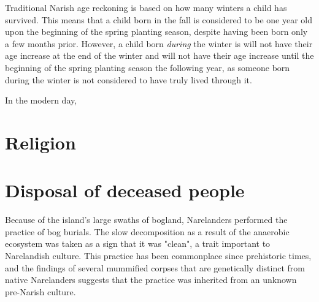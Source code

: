 \documentclass[a4paper,11pt,twoside,openright]{memoir}
\begin{document}
Traditional Narish age reckoning is based on how many winters a child has survived. This means that a child born in the fall is considered to be one year old upon the beginning of the spring planting season, despite having been born only a few months prior. However, a child born \emph{during} the winter is will not have their age increase at the end of the winter and will not have their age increase until the beginning of the spring planting season the following year, as someone born during the winter is not considered to have truly lived through it.

In the modern day, 

\chapter{Religion}

\chapter{Disposal of deceased people}

Because of the island's large swaths of bogland, Narelanders performed the practice of bog burials. The slow decomposition as a result of the anaerobic ecosystem was taken as a sign that it was "clean", a trait important to Narelandish culture. This practice has been commonplace since prehistoric times, and the findings of several mummified corpses that are genetically distinct from native Narelanders suggests that the practice was inherited from an unknown pre-Narish culture.
\end{document}
